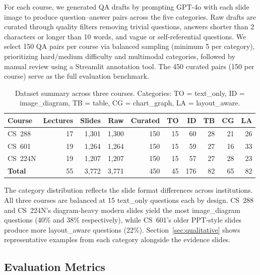\documentclass{article} %
\begin{document}
For each course, we generated QA drafts by prompting GPT-4o with each slide image to produce question--answer pairs across the five categories. Raw drafts are curated through quality filters removing trivial questions, answers shorter than 2 characters or longer than 10 words, and vague or self-referential questions. We select 150 QA pairs per course via balanced sampling (minimum 5 per category), prioritizing hard/medium difficulty and multimodal categories, followed by manual review using a Streamlit annotation tool. The 450 curated pairs (150 per course) serve as the full evaluation benchmark.

\begin{table}[htbp]
\caption{Dataset summary across three courses. Categories: TO = text\_only, ID = image\_diagram, TB = table, CG = chart\_graph, LA = layout\_aware.}
\label{tab:dataset}
\begin{center}
\begin{tabular}{lrrrrrrrrr}
\toprule
\textbf{Course} & \textbf{Lectures} & \textbf{Slides} & \textbf{Raw} & \textbf{Curated} & \textbf{TO} & \textbf{ID} & \textbf{TB} & \textbf{CG} & \textbf{LA} \\
\midrule
CS~288   & 17 & 1{,}301 & 1{,}300 & 150 & 15 & 60 & 28 & 21 & 26 \\
CS~601   & 19 & 1{,}264 & 1{,}264 & 150 & 15 & 59 & 27 & 16 & 33 \\
CS~224N  & 19 & 1{,}207 & 1{,}207 & 150 & 15 & 57 & 27 & 28 & 23 \\
\midrule
\textbf{Total} & 55 & 3{,}772 & 3{,}771 & 450 & 45 & 176 & 82 & 65 & 82 \\
\bottomrule
\end{tabular}
\end{center}
\end{table}

The category distribution reflects the slide format differences across institutions. All three courses are balanced at 15 text\_only questions each by design. CS~288 and CS~224N's diagram-heavy modern slides yield the most image\_diagram questions (40\% and 38\% respectively), while CS~601's older PPT-style slides produce more layout\_aware questions (22\%). Section~\ref{sec:qualitative} shows representative examples from each category alongside the evidence slides.

\subsection{Evaluation Metrics}
\end{document}
